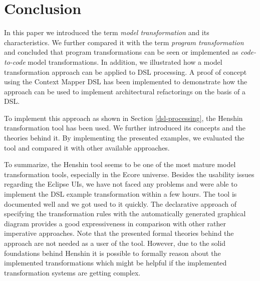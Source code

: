 \documentclass[runningheads]{llncs}
\begin{document}
\section{Conclusion}
In this paper we introduced the term \textit{model transformation} and its characteristics. We further compared it with the term \textit{program transformation} and concluded that program transformations can be seen or implemented as \textit{code-to-code} model transformations. In addition, we illustrated how a model transformation approach can be applied to DSL processing. A proof of concept using the Context Mapper DSL \cite{context-mapper} has been implemented to demonstrate how the approach can be used to implement architectural refactorings \cite{ZimmermannArchitecturalRefactorings} on the basis of a DSL.

To implement this approach as shown in Section \ref{dsl-processing}, the Henshin transformation tool has been used. We further introduced its concepts and the theories behind it. By implementing the presented examples, we evaluated the tool and compared it with other available approaches. 

To summarize, the Henshin tool seems to be one of the most mature model transformation tools, especially in the Ecore universe. Besides the usability issues regarding the Eclipse UIs, we have not faced any problems and were able to implement the DSL example transformation within a few hours. The tool is documented well and we got used to it quickly. The declarative approach of specifying the transformation rules with the automatically generated graphical diagram provides a good expressiveness in comparison with other rather imperative approaches. Note that the presented formal theories behind the approach are not needed as a user of the tool. However, due to the solid foundations behind Henshin it is possible to formally reason about the implemented transformations which might be helpful if the implemented transformation systems are getting complex. 

\newpage


\end{document}
